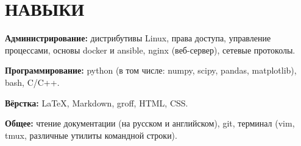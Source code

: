 \section{НАВЫКИ}

\begin{description}

    \setlength\itemsep{-0.4em}

    \item{\bfseries Администрирование:}
        дистрибутивы Linux, права доступа, управление процессами, основы docker
        и ansible, nginx (веб-сервер), сетевые протоколы.
    
    \item{\bfseries Программирование:}
        python (в том числе: numpy, scipy, pandas, matplotlib), bash, C/C++.
    
    \item{\bfseries Вёрстка:}
        \LaTeX, Markdown, groff, HTML, CSS.

    \item{\bfseries Общее:}
        чтение документации (на русском и английском), git, терминал (vim,
        tmux, различные утилиты командной строки).

\end{description}
    
    \vspace{.7em}
